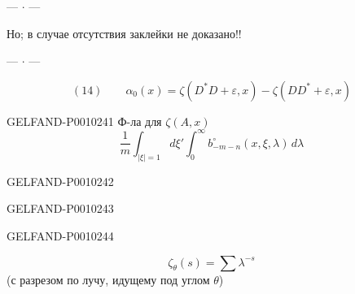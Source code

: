 \begin{center}--- $\cdot$ ---\end{center}

Но; в случае отсутствия заклейки не доказано!!

\begin{center}--- $\cdot$ ---\end{center}

\[
(14)\qquad \alpha_0(x)=\zeta(D^*D+\varepsilon,x)-\zeta(DD^*+\varepsilon,x)
\]


\begin{GelfandAdjacentEvidence}{GELFAND-P001024}{1}
Ф-ла для $\zeta(A,x)$
\begin{equation*}
\frac{1}{m}\int_{|\xi|=1}d\xi'\int_0^\infty
b^\circ_{-m-n}(x,\xi,\lambda)\,d\lambda
\tag{15}
\end{equation*}
\end{GelfandAdjacentEvidence}
\begin{GelfandAdjacentEvidence}{GELFAND-P001024}{2}


\end{GelfandAdjacentEvidence}
\begin{GelfandAdjacentEvidence}{GELFAND-P001024}{3}


\end{GelfandAdjacentEvidence}
\begin{GelfandAdjacentEvidence}{GELFAND-P001024}{4}

\[
\zeta_\theta(s)=\sum\lambda^{-s}
\]
(с разрезом по лучу, идущему под углом $\theta$)

\end{GelfandAdjacentEvidence}
